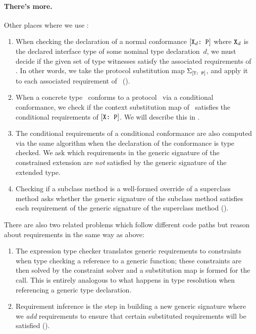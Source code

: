 \documentclass[../generics]{subfiles}
\begin{document}
\paragraph{There's more.} Other places where we use :
\begin{enumerate}
\item When checking the declaration of a normal conformance $[\texttt{$\texttt{X}_d$:~P}]$ where $\texttt{X}_d$ is the declared interface type of some nominal type declaration~$d$, we must decide if the given set of type witnesses satisfy the associated requirements of \tP. In other words, we take the protocol substitution map $\Sigma_{[\texttt{T:~P}]}$, and apply it to each associated requirement of \tP\ ().

\item When a concrete type \tX\ conforms to a protocol \tP\ via a conditional conformance, we check if the context substitution map of \tX\ satisfies the conditional requirements of $[\texttt{X:~P}]$. We will describe this in .

\item The conditional requirements of a conditional conformance are also computed via the same algorithm when the declaration of the conformance is type checked. We ask which requirements in the generic signature of the constrained extension are \emph{not} satisfied by the generic signature of the extended type.

\item Checking if a subclass method is a well-formed override of a superclass method asks whether the generic signature of the subclass method satisfies each requirement of the generic signature of the superclass method ().
\end{enumerate}
There are also two related problems which follow different code paths but reason about requirements in the same way as above:
\begin{enumerate}
\item The expression type checker translates generic requirements to constraints when type checking a reference to a generic function; these constraints are then solved by the constraint solver and a substitution map is formed for the call. This is entirely analogous to what happens in type resolution when referencing a generic type declaration.

\item Requirement inference is the step in building a new generic signature where we \emph{add} requirements to ensure that certain substituted requirements will be satisfied ().
\end{enumerate}
\end{document}
